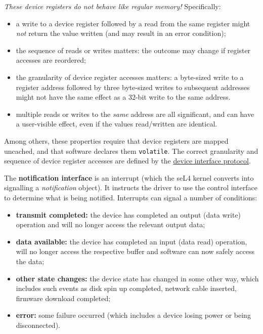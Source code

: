 \documentclass[a4paper,12pt]{report}
\newcommand{\code}[1]{\texttt{#1}}
\newcommand{\Obj}[1]{\textsl{#1}}
\begin{document}
\emph{These device
registers do \emph{not} behave like regular memory!} Specifically:
\begin{itemize}
\item a write to a device register followed by a read from the same
  register might \emph{not} return the value written (and may result
  in an error condition);
\item the sequence of reads or writes matters: the outcome may change
  if register accesses are reordered;
\item the granularity of device register accesses matters: a byte-sized write to a register address
  followed by three byte-sized writes to subsequent addresses might not
  have the same effect as a 32-bit write to the same address.
\item multiple reads or writes to the \emph{same} address are all
  significant, and can have a user-visible effect, even if the values
  read/written are identical.
\end{itemize}
Among others, these properties require that device registers are
mapped uncached, and that software declares them \code{volatile}. The
correct granularity and sequence of device register accesses are
defined by the \hyperref[s:dev_proto]{device interface protocol}.

The \textbf{notification interface} is an interrupt (which the seL4 kernel
converts into signalling a \Obj{notification} object). It instructs
the driver to use the control interface to determine
what is being notified. Interrupts can signal a number of conditions:
\begin{itemize}
\item \textbf{transmit completed:} the device has completed an output (data
  write) operation and will no longer access the relevant output data;
\item \textbf{data available:} the device has completed an input (data read)
  operation, will no longer access the respective buffer and software
  can now safely access the data;
\item \textbf{other state changes:} the device state has changed in
  some other way, which includes such events as disk spin up
  completed, network cable inserted, firmware download completed;
\item \textbf{error:} some failure occurred (which includes a device losing
  power or being disconnected).
\end{itemize}
\end{document}
